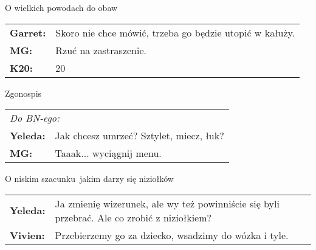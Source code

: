 \documentclass[10pt,twoside,twocolumn]{book}
\begin{document}
\begin{rpg-quotebox}{O wielkich powodach do obaw}
   \begin{tabularx}{\columnwidth}{lX}
      \textbf{Garret:} & Skoro nie chce mówić, trzeba go będzie utopić w kałuży.\\
      \textbf{MG:} & Rzuć na zastraszenie.\\
      \textbf{K20:} & 20\\
   \end{tabularx}
\end{rpg-quotebox}

\begin{rpg-quotebox}{Zgonospis}
   \begin{tabularx}{\columnwidth}{lX}
      \multicolumn{2}{l}{\textit{Do BN-ego:}}\\
      \textbf{Yeleda:} & Jak chcesz umrzeć? Sztylet, miecz, łuk?\\
      \textbf{MG:} & Taaak... wyciągnij menu.\\
   \end{tabularx}
\end{rpg-quotebox}

\begin{rpg-quotebox}{O niskim szacunku\, jakim darzy się niziołków}
   \begin{tabularx}{\columnwidth}{lX}
      \textbf{Yeleda:} & Ja zmienię wizerunek, ale wy też powinniście się byli przebrać. Ale co zrobić z niziołkiem?\\
      \textbf{Vivien:} & Przebierzemy go za dziecko, wsadzimy do wózka i tyle.\\
   \end{tabularx}
\end{rpg-quotebox}




%    
%       
\end{document}
